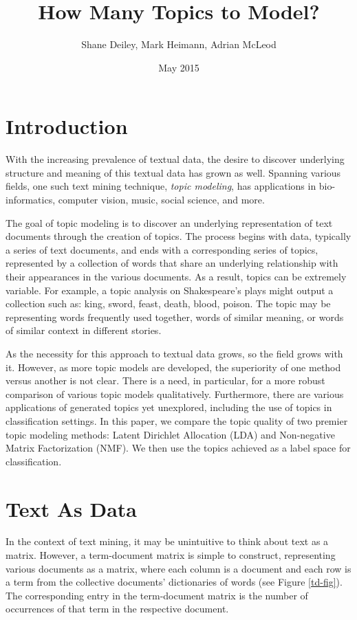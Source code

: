\documentclass[10pt]{article}
\title{How Many Topics to Model?}
\author{Shane Deiley, Mark Heimann, Adrian McLeod}
\date{May 2015}
\begin{document}
\maketitle

\section{Introduction}
With the increasing prevalence of textual data, the desire to discover underlying structure and meaning of this textual data has grown as well.  Spanning various fields, one such text mining technique, \textit{topic modeling}, has applications in bio-informatics, computer vision, music, social science, and more.

The goal of topic modeling is to discover an underlying representation of text documents through the creation of topics. The process begins with data, typically a series of text documents, and ends with a corresponding series of topics, represented by a collection of words that share an underlying relationship with their appearances in the various documents.  As a result, topics can be extremely variable.  For example, a topic analysis on Shakespeare’s plays might output a collection such as: king, sword, feast, death, blood, poison.  The topic may be representing words frequently used together, words of similar meaning, or words of similar context in different stories.

As the necessity for this approach to textual data grows, so the field grows with it.  However, as more topic models are developed, the superiority of one method versus another is not clear.  There is a need, in particular, for a more robust comparison of various topic models qualitatively.  Furthermore, there are various applications of generated topics yet unexplored, including the use of topics in classification settings.  In this paper, we compare the topic quality of two premier topic modeling methods: Latent Dirichlet Allocation (LDA) and Non-negative Matrix Factorization (NMF).  We then use the topics achieved as a label space for classification. 

\section{Text As Data}
In the context of text mining, it may be unintuitive to think about text as a matrix.  However, a term-document matrix is simple to construct, representing various documents as a matrix, where each column is a document and each row is a term from the collective documents' dictionaries of words (see Figure \ref{td-fig}).  The corresponding entry in the term-document matrix is the number of occurrences of that term in the respective document.
\end{document}
